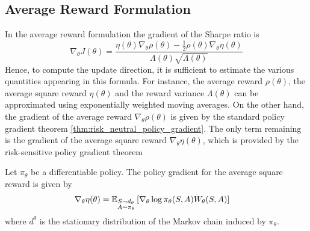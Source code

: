 \subsection{Average Reward Formulation}
In the average reward formulation the gradient of the Sharpe ratio is
\begin{equation}
	\nabla_\theta J(\theta) = \frac{\eta(\theta) \nabla_\theta \rho(\theta) - \frac{1}{2} \rho(\theta) \nabla_\theta \eta(\theta)}{\Lambda(\theta) \sqrt{\Lambda(\theta)}}
\end{equation}
Hence, to compute the update direction, it is sufficient to estimate the various quantities appearing in this formula. For instance, the average reward $\rho(\theta)$, the average square reward $\eta(\theta)$ and the reward variance $\Lambda(\theta)$ can be approximated using exponentially weighted moving averages. On the other hand, the gradient of the average reward $\nabla_\theta \rho(\theta)$ is given by the standard policy gradient theorem \ref{thm:risk_neutral_policy_gradient}. The only term remaining is the gradient of the average square reward $\nabla_\theta \eta(\theta)$, which is provided by the risk-sensitive policy gradient theorem 
\begin{theorem}
	Let $\pi_\theta$ be a differentiable policy. The policy gradient for the average square reward is given by
	\begin{equation}\label{eq:policy_gradient_theorem_W}
		\begin{split}
			\nabla_\theta \eta(\theta) &= \E[\substack{S\sim d_\theta \\ 
			A \sim \pi_\theta}]{\nabla_\theta \log \pi_\theta(S,A) W_\theta(S,A)}
		\end{split}
	\end{equation}
	where $d^\theta$ is the stationary distribution of the Markov chain induced by $\pi_\theta$. 
\end{theorem}
